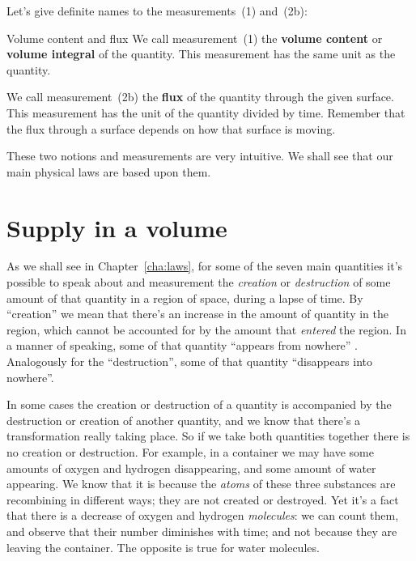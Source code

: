 \documentclass[a4paper,12pt,%
onecolumn,oneside,%
british%
]{memoir}
\renewcommand*{\|}[1][]{\nonscript\:#1\vert\nonscript\:\mathopen{}}
\newcommand*{\chap}{Chapter}%
\begin{document}
\medskip

Let's give definite names to the measurements~(1) and~(2b):
\begin{definition}{Volume content and flux}
  We call measurement~(1) the \textbf{volume content} or \textbf{volume integral} of the quantity. This measurement has the same unit as the quantity.

  \smallskip

  We call measurement~(2b) the \textbf{flux} of the quantity through the given surface. This measurement has the unit of the quantity divided by time. Remember that the flux through a surface depends on how that surface is moving.
\end{definition}

\medskip

These two notions and measurements are very intuitive. We shall see that our main physical laws are based upon them.

\section{Supply in a volume}
\label{sec:supply}

As we shall see in \chap~\ref{cha:laws}, for some of the seven main quantities it's possible to speak about and measurement the \emph{creation} or \emph{destruction} of some amount of that quantity in a region of space, during a lapse of time. By \enquote{creation} we mean that there's an increase in the amount of quantity in the region, which cannot be accounted for by the amount that \emph{entered} the region. In a manner of speaking, some of that quantity \enquote{appears from nowhere} . Analogously for the \enquote{destruction}, some of that quantity \enquote{disappears into nowhere}.

In some cases the creation or destruction of a quantity is accompanied by the destruction or creation of another quantity, and we know that there's a transformation really taking place. So if we take both quantities together there is no creation or destruction. For example, in a container we may have some amounts of oxygen and hydrogen disappearing, and some amount of water appearing. We know that it is because the \emph{atoms} of these three substances are recombining in different ways; they are not created or destroyed. Yet it's a fact that there is a decrease of oxygen and hydrogen \emph{molecules}: we can count them, and observe that their number diminishes with time; and not because they are leaving the container. The opposite is true for water molecules.
\end{document}
